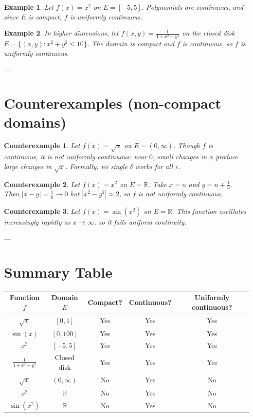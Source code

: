 \documentclass[11pt,a4paper]{article}
\newtheorem{example}{Example}
\newtheorem{counterexample}{Counterexample}
\begin{document}
	\begin{example}
		Let $f(x) = x^2$ on $E=[-5,5]$.  
		Polynomials are continuous, and since $E$ is compact, $f$ is uniformly continuous.
	\end{example}
	
	\begin{example}
		In higher dimensions, let $f(x,y)=\tfrac{1}{1+x^2+y^2}$ on the closed disk 
		$E=\{(x,y):x^2+y^2\leq 10\}$.  
		The domain is compact and $f$ is continuous, so $f$ is uniformly continuous.
	\end{example}
	
	---
	
	\section*{Counterexamples (non-compact domains)}
	
	\begin{counterexample}
		Let $f(x)=\sqrt{x}$ on $E=(0,\infty)$.  
		Though $f$ is continuous, it is not uniformly continuous: near $0$, small changes in $x$ produce large changes in $\sqrt{x}$.  
		Formally, no single $\delta$ works for all $\varepsilon$.
	\end{counterexample}
	
	\begin{counterexample}
		Let $f(x)=x^2$ on $E=\mathbb{R}$.  
		Take $x=n$ and $y=n+\tfrac{1}{n}$.  
		Then $|x-y|=\tfrac{1}{n}\to 0$ but $|x^2-y^2|\approx 2$, so $f$ is not uniformly continuous.
	\end{counterexample}
	
	\begin{counterexample}
		Let $f(x)=\sin(x^2)$ on $E=\mathbb{R}$.  
		This function oscillates increasingly rapidly as $x\to\infty$, so it fails uniform continuity.
	\end{counterexample}
	
	---
	
	\section*{Summary Table}
	
	\renewcommand{\arraystretch}{1.3}
	\begin{tabular}{|c|c|c|c|c|}
		\hline
		Function $f$ & Domain $E$ & Compact? & Continuous? & Uniformly continuous? \\
		\hline
		$\sqrt{x}$ & $[0,1]$ & Yes & Yes & Yes \\
		\hline
		$\sin(x)$ & $[0,100]$ & Yes & Yes & Yes \\
		\hline
		$x^2$ & $[-5,5]$ & Yes & Yes & Yes \\
		\hline
		$\tfrac{1}{1+x^2+y^2}$ & Closed disk & Yes & Yes & Yes \\
		\hline
		$\sqrt{x}$ & $(0,\infty)$ & No & Yes & No \\
		\hline
		$x^2$ & $\mathbb{R}$ & No & Yes & No \\
		\hline
		$\sin(x^2)$ & $\mathbb{R}$ & No & Yes & No \\
		\hline
	\end{tabular}
	
\end{document}

